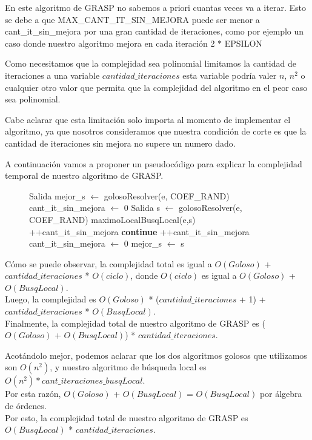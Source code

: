 En este algoritmo de GRASP no sabemos a priori cuantas veces va a iterar. Esto se debe a que MAX\_CANT\_IT\_SIN\_MEJORA puede ser menor a cant\_it\_sin\_mejora por una gran cantidad de iteraciones, como por ejemplo un caso donde nuestro algoritmo mejora en cada iteración 2 $*$ EPSILON

Como necesitamos que la complejidad sea polinomial limitamos la cantidad de iteraciones a una variable $cantidad\_iteraciones$ esta variable podría valer $n$, $n^2$ o cualquier otro valor que permita que la complejidad del algoritmo en el peor caso sea polinomial.

Cabe aclarar que esta limitación solo importa al momento de implementar el algoritmo, ya que nosotros consideramos que nuestra condición de corte es que la cantidad de iteraciones sin mejora no supere un numero dado.

A continuación vamos a proponer un pseudocódigo para explicar la complejidad temporal de nuestro algoritmo de GRASP.

\begin{center}
 \begin{figure}[H]
  \begin{pseudo}
    \State Salida mejor\_s $\leftarrow$ golosoResolver(e, COEF\_RAND) 
    \State cant\_it\_sin\_mejora $\leftarrow$ 0 
     
      \State Salida s $\leftarrow$ golosoResolver(e, COEF\_RAND) 
      \State maximoLocalBusqLocal(e,s) 
       
	\State++cant\_it\_sin\_mejora 
	\State \textbf{continue}
      \EndIf
       
	\State ++cant\_it\_sin\_mejora 
      \Else
	\State cant\_it\_sin\_mejora $\leftarrow$ 0 
      \EndIf
       
	\State mejor\_s $\leftarrow$ s 
      \EndIf
    \EndWhile
    \EndProcedure
  \end{pseudo}
 \end{figure}
\end{center}

Cómo se puede observar, la complejidad total es igual a $O(Goloso)$ + $cantidad\_iteraciones$ * $O(ciclo)$, donde $O(ciclo)$ es igual a  $O(Goloso)$ + $O(BusqLocal)$.\\
Luego, la complejidad es $O(Goloso)$ * ($cantidad\_iteraciones$ + 1) + $cantidad\_iteraciones$ * $O(BusqLocal)$.\\
Finalmente, la complejidad total de nuestro algoritmo de GRASP es ($O(Goloso)$ + $O(BusqLocal)$) * $cantidad\_iteraciones$.

Acotándolo mejor, podemos aclarar que los dos algoritmos golosos que utilizamos son $O(n^2)$, y nuestro algoritmo de búsqueda local es $O(n^2) * cant\_iteraciones\_busqLocal$.\\
Por esta razón, $O(Goloso)$ + $O(BusqLocal)$ = $O(BusqLocal)$ por álgebra de órdenes.\\
Por esto, la complejidad total de nuestro algoritmo de GRASP es $O(BusqLocal)$ * $cantidad\_iteraciones$.